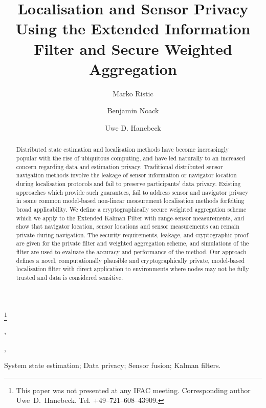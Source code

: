 \documentclass[twocolumn]{autart}    %
\begin{document}
\begin{frontmatter}

\title{Localisation and Sensor Privacy Using the Extended Information Filter and Secure Weighted Aggregation} %

\thanks[footnoteinfo]{This paper was not presented at any IFAC 
meeting. Corresponding author Uwe~D.~Hanebeck. Tel. +49--721--608--43909.}

\author[ISAS]{Marko Ristic},
\author[ISAS]{Benjamin Noack},
\author[ISAS]{Uwe D. Hanebeck}

\address[ISAS]{Intelligent Sensor-Actuator-Systems Laboratory, Institute for Anthropomatics, Karlsruhe Institute of Technology, 76131 Karlsruhe, Germany}  %

\begin{keyword}
System state estimation; Data privacy; Sensor fusion; Kalman filters.
\end{keyword}


\begin{abstract} %
Distributed state estimation and localisation methods have become increasingly popular with the rise of ubiquitous computing, and have led naturally to an increased concern regarding data and estimation privacy. Traditional distributed sensor navigation methods involve the leakage of sensor information or navigator location during localisation protocols and fail to preserve participants’ data privacy. Existing approaches which provide such guarantees, fail to address sensor and navigator privacy in some common model-based non-linear measurement localisation methods forfeiting broad applicability. We define a cryptographically secure weighted aggregation scheme which we apply to the Extended Kalman Filter with range-sensor measurements, and show that navigator location, sensor locations and sensor measurements can remain private during navigation. The security requirements, leakage, and cryptographic proof are given for the private filter and weighted aggregation scheme, and simulations of the filter are used to evaluate the accuracy and performance of the method. Our approach defines a novel, computationally plausible and cryptographically private, model-based localisation filter with direct application to environments where nodes may not be fully trusted and data is considered sensitive.
\end{abstract}

\end{frontmatter}
\end{document}
